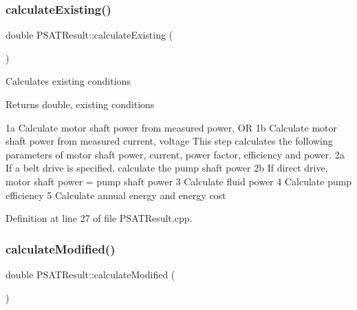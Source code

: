 \subsubsection{\texorpdfstring{calculate\+Existing()}{calculateExisting()}}
{\footnotesize\ttfamily double P\+S\+A\+T\+Result\+::calculate\+Existing (\begin{DoxyParamCaption}{ }\end{DoxyParamCaption})}

Calculates existing conditions \begin{DoxyReturn}{Returns}
double, existing conditions 
\end{DoxyReturn}
1a Calculate motor shaft power from measured power, OR 1b Calculate motor shaft power from measured current, voltage This step calculates the following parameters of motor shaft power, current, power factor, efficiency and power. 2a If a belt drive is specified, calculate the pump shaft power 2b If direct drive, motor shaft power = pump shaft power 3 Calculate fluid power 4 Calculate pump efficiency 5 Calculate annual energy and energy cost

Definition at line 27 of file P\+S\+A\+T\+Result.\+cpp.

\mbox{\label{class_p_s_a_t_result_afbb68257a28c1b853d26faf3227461cc}} 
\subsubsection{\texorpdfstring{calculate\+Modified()}{calculateModified()}}
{\footnotesize\ttfamily double P\+S\+A\+T\+Result\+::calculate\+Modified (\begin{DoxyParamCaption}{ }\end{DoxyParamCaption})}

